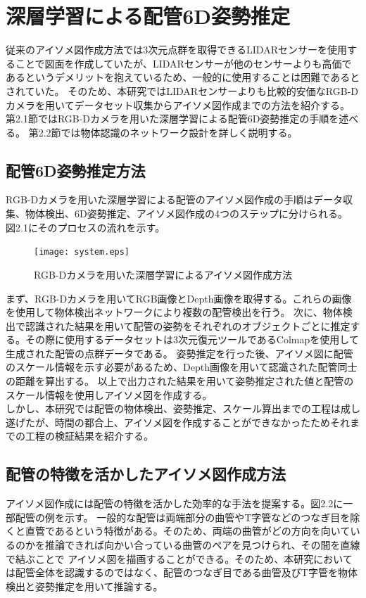 \chapter{%
深層学習による配管6D姿勢推定}

従来のアイソメ図作成方法では3次元点群を取得できるLIDARセンサーを使用することで図面を作成していたが、LIDARセンサーが他のセンサーよりも高価であるというデメリットを抱えているため、一般的に使用することは困難であるとされていた。
そのため、本研究ではLIDARセンサーよりも比較的安価なRGB-Dカメラを用いてデータセット収集からアイソメ図作成までの方法を紹介する。
第2.1節ではRGB-Dカメラを用いた深層学習による配管6D姿勢推定の手順を述べる。
第2.2節では物体認識のネットワーク設計を詳しく説明する。

\section{配管6D姿勢推定方法}
RGB-Dカメラを用いた深層学習による配管のアイソメ図作成の手順はデータ収集、物体検出、6D姿勢推定、アイソメ図作成の4つのステップに分けられる。
図2.1にそのプロセスの流れを示す。

\begin{figure}[htbt]
	\texttt{[image: system.eps]}
	\caption{RGB-Dカメラを用いた深層学習によるアイソメ図作成方法}
	\label{fig:f2}
\end{figure}

まず、RGB-Dカメラを用いてRGB画像とDepth画像を取得する。これらの画像を使用して物体検出ネットワークにより複数の配管検出を行う。
次に、物体検出で認識された結果を用いて配管の姿勢をそれぞれのオブジェクトごとに推定する。その際に使用するデータセットは3次元復元ツールであるColmapを使用して生成された配管の点群データである。
姿勢推定を行った後、アイソメ図に配管のスケール情報を示す必要があるため、Depth画像を用いて認識された配管同士の距離を算出する。
以上で出力された結果を用いて姿勢推定された値と配管のスケール情報を使用しアイソメ図を作成する。\\
しかし、本研究では配管の物体検出、姿勢推定、スケール算出までの工程は成し遂げたが、時間の都合上、アイソメ図を作成することができなかったためそれまでの工程の検証結果を紹介する。

\section{配管の特徴を活かしたアイソメ図作成方法}
アイソメ図作成には配管の特徴を活かした効率的な手法を提案する。図2.2に一部配管の例を示す。
一般的な配管は両端部分の曲管やT字管などのつなぎ目を除くと直管であるという特徴がある。そのため、両端の曲管がどの方向を向いているのかを推論できれば向かい合っている曲管のペアを見つけられ、その間を直線で結ぶことで
アイソメ図を描画することができる。そのため、本研究においては配管全体を認識するのではなく、配管のつなぎ目である曲管及びT字管を物体検出と姿勢推定を用いて推論する。

